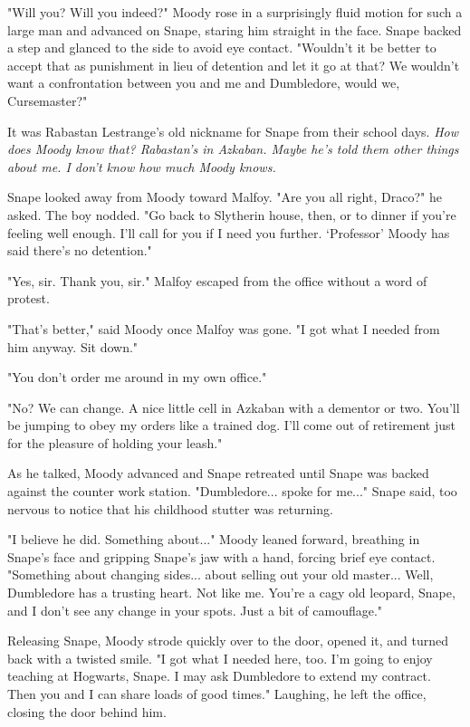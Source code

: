 "Will you? Will you indeed?" Moody rose in a surprisingly fluid motion for such a large man and advanced on Snape, staring him straight in the face. Snape backed a step and glanced to the side to avoid eye contact. "Wouldn't it be better to accept that as punishment in lieu of detention and let it go at that? We wouldn't want a confrontation between you and me and Dumbledore, would we, Cursemaster?"

It was Rabastan Lestrange's old nickname for Snape from their school days. \emph{How does Moody know that? Rabastan's in Azkaban. Maybe he's told them other things about me. I don't know how much Moody knows.}

Snape looked away from Moody toward Malfoy. "Are you all right, Draco?" he asked. The boy nodded. "Go back to Slytherin house, then, or to dinner if you're feeling well enough. I'll call for you if I need you further. `Professor' Moody has said there's no detention."

"Yes, sir. Thank you, sir." Malfoy escaped from the office without a word of protest.

"That's better," said Moody once Malfoy was gone. "I got what I needed from him anyway. Sit down."

"You don't order me around in my own office."

"No? We can change. A nice little cell in Azkaban with a dementor or two. You'll be jumping to obey my orders like a trained dog. I'll come out of retirement just for the pleasure of holding your leash."

As he talked, Moody advanced and Snape retreated until Snape was backed against the counter work station. "Dumbledore... spoke for me..." Snape said, too nervous to notice that his childhood stutter was returning.

"I believe he did. Something about..." Moody leaned forward, breathing in Snape's face and gripping Snape's jaw with a hand, forcing brief eye contact. "Something about changing sides... about selling out your old master... Well, Dumbledore has a trusting heart. Not like me. You're a cagy old leopard, Snape, and I don't see any change in your spots. Just a bit of camouflage."

Releasing Snape, Moody strode quickly over to the door, opened it, and turned back with a twisted smile. "I got what I needed here, too. I'm going to enjoy teaching at Hogwarts, Snape. I may ask Dumbledore to extend my contract. Then you and I can share loads of good times." Laughing, he left the office, closing the door behind him.

